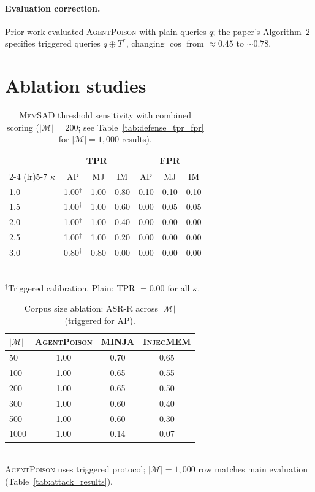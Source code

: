 \documentclass{article}
\theoremstyle{definition}
\newcommand{\asrr}{\text{ASR-R}}
\newcommand{\cM}{\mathcal{M}}
\newcommand{\memsad}{\textnormal{\textsc{MemSAD}}}
\newcommand{\agentpoison}{\textsc{AgentPoison}}
\newcommand{\minja}{\textsc{MINJA}}
\newcommand{\injecmem}{\textsc{InjecMEM}}
\newcommand{\trigger}{T}
\DeclareMathOperator{\cosim}{cos}
\begin{document}
\paragraph{Evaluation correction.} Prior work evaluated \agentpoison{} with plain queries $q$; the paper's Algorithm~2 specifies triggered queries $q \oplus \trigger^*$, changing $\cosim$ from $\approx 0.45$ to $\sim 0.78$.

\section{Ablation studies}
\label{app:ablation}

\begin{table}[ht]
  \centering
  \small
  \caption{\memsad{} threshold sensitivity with combined scoring ($|\cM|=200$; see Table~\ref{tab:defense_tpr_fpr} for $|\cM|=1{,}000$ results).}
  \label{tab:ablation_threshold}
  \vspace{2pt}
  \begin{tabular}{l ccc ccc}
    \toprule
    & \multicolumn{3}{c}{TPR} & \multicolumn{3}{c}{FPR} \\
    \cmidrule(lr){2-4} \cmidrule(lr){5-7}
    $\kappa$ & AP & MJ & IM & AP & MJ & IM \\
    \midrule
    1.0 & 1.00$^\dagger$ & 1.00 & 0.80 & 0.10 & 0.10 & 0.10 \\
    1.5 & 1.00$^\dagger$ & 1.00 & 0.60 & 0.00 & 0.05 & 0.05 \\
    2.0 & 1.00$^\dagger$ & 1.00 & 0.40 & 0.00 & 0.00 & 0.00 \\
    2.5 & 1.00$^\dagger$ & 1.00 & 0.20 & 0.00 & 0.00 & 0.00 \\
    3.0 & 0.80$^\dagger$ & 0.80 & 0.00 & 0.00 & 0.00 & 0.00 \\
    \bottomrule
  \end{tabular}
  \\[2pt]
  {\footnotesize $^\dagger$Triggered calibration. Plain: TPR $= 0.00$ for all $\kappa$.}
\end{table}

\begin{table}[ht]
  \centering
  \small
  \caption{Corpus size ablation: $\asrr$ across $|\cM|$ (triggered for AP).}
  \label{tab:ablation_corpus}
  \vspace{2pt}
  \begin{tabular}{lccc}
    \toprule
    $|\cM|$ & \agentpoison{} & \minja{} & \injecmem{} \\
    \midrule
    50   & 1.00 & 0.70 & 0.65 \\
    100  & 1.00 & 0.65 & 0.55 \\
    200  & 1.00 & 0.65 & 0.50 \\
    300  & 1.00 & 0.60 & 0.40 \\
    500  & 1.00 & 0.60 & 0.30 \\
    1000 & 1.00 & 0.14 & 0.07 \\
    \bottomrule
  \end{tabular}
  \\[2pt]
  {\footnotesize \agentpoison{} uses triggered protocol; $|\cM|=1{,}000$ row matches main evaluation (Table~\ref{tab:attack_results}).}
\end{table}
\end{document}
